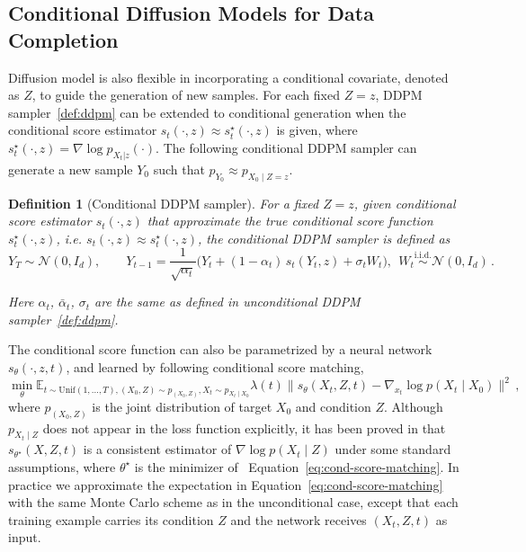 \documentclass{article}
\def\Eqref#1{Equation~\ref{#1}}
\newtheorem{definition}{Definition}[section]
\begin{document}
\subsection{Conditional Diffusion Models for Data Completion}
\label{sec:proposed_method}
Diffusion model is also flexible in incorporating a conditional covariate, denoted as $Z$, to guide the generation of new samples.  For each fixed $Z=z$, DDPM sampler~\ref{def:ddpm} can be extended to conditional generation when the conditional score estimator $s_t(\cdot, z) \approx s_t^{\star}(\cdot,z)$ is given, where $s_t^{\star}(\cdot,z)=\nabla \log p_{X_t|z}(\cdot)$. The following conditional DDPM sampler can generate a new sample $Y_0$ such that $p_{Y_0} \approx p_{X_0 \mid Z=z}$.  
\begin{definition}[Conditional DDPM sampler]\label{def:cond-DDPM-sampler}
For a fixed $Z=z$, given conditional score estimator $s_t(\cdot,z)$ that approximate the true conditional score function $s_t^{\star}(\cdot,z)$, i.e. $s_t(\cdot,z) \approx s_t^{\star}(\cdot,z)$, the conditional DDPM sampler is defined as 
\begin{equation}
Y_T\sim\mathcal N(0,I_{d}),\qquad
Y_{t-1}=\frac{1}{\sqrt{\alpha_t}}\Big(Y_t+(1-\alpha_t)\,s_t(Y_t, z)+\sigma_tW_t\Big),
\ \ W_t\stackrel{\text{i.i.d.}}{\sim}\mathcal N(0,I_{d})\,.
\end{equation}

Here $\alpha_t$, $\bar{\alpha}_t$, $\sigma_t$ are the same as defined in unconditional DDPM sampler~\ref{def:ddpm}.
\end{definition}

The conditional score function can also be parametrized by a neural network $s_{\theta}(\cdot, z, t)$, and learned by following conditional score matching,
\begin{equation}
\label{eq:cond-score-matching}
    \min_{\theta} \mathbb{E}_{t \sim \mathrm{Unif}{(1,\dots,T)}, (X_0, Z) \sim p_{(X_0,Z)}, X_t \sim p_{X_t \mid X_0}} \lambda(t)\| s_{\theta}(X_t,Z,t) - \nabla_{x_t} \log p(X_t \mid X_0) \|^2\,,
\end{equation}
where $p_{(X_0, Z)}$ is the joint distribution of target $X_0$ and condition $Z$. 
Although $p_{X_t \mid Z}$ does not appear in the loss function explicitly, it has been proved in \citet{batzolis2021conditional,vincent2011connection} that $s_{\theta^\star}(X, Z, t)$ is a consistent estimator of $\nabla\log p(X_t \mid Z)$ under some standard assumptions, where $\theta^\star$ is the minimizer of ~\Eqref{eq:cond-score-matching}. In practice we approximate the expectation in \Eqref{eq:cond-score-matching} with the same Monte Carlo scheme as in the unconditional case, except that each training example carries its condition $Z$ and the network receives $(X_t,Z,t)$ as input. 
\end{document}
